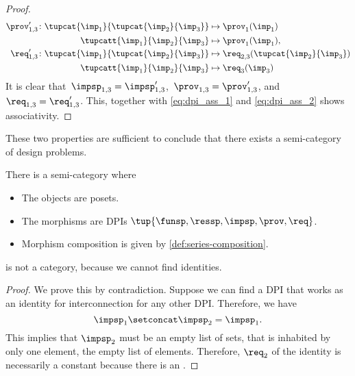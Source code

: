 \begin{proof}
\begin{equation}
\begin{aligned}
    \prov'_{1,3} \colon  \tupcat {\imp_{1}}{\tupcat {\imp_{2}} {\imp_{3}}}   &\mapsto\prov_{1}(\imp_{1})\\
    \tupcatt{\imp_{1}}{\imp_{2}}{\imp_{3}} &\mapsto\prov_{1}(\imp_{1}),\\
    \req'_{1,3} \colon  \tupcat {\imp_{1}}{\tupcat {\imp_{2}} {\imp_{3}}} &\mapsto\req_{2,3}(\tupcat {\imp_{2}} {\imp_{3}})\\
    \tupcatt{\imp_{1}}{\imp_{2}}{\imp_{3}}&\mapsto \req_{3}(\imp_{3})
  \end{aligned}
  \end{equation}
It is clear that~$\impsp_{1,3}=\impsp'_{1,3}$,~$\prov_{1,3}=\prov'_{1,3}$, and~$\req_{1,3}=\req'_{1,3}$.
  This, together with \cref{eq:dpi_ass_1} and \cref{eq:dpi_ass_2} shows associativity.
\end{proof}

These two properties are sufficient to conclude that there exists a semi-category of design problems.



\begin{definition}
  \label{def:DPIcat}
  There is a semi-category \DPI where
  \begin{itemize}
    \item The objects are posets.
    \item The morphisms are DPIs $\tup{\funsp,\ressp,\impsp,\prov,\req}$.
    \item Morphism composition is given by \cref{def:series-composition}.
  \end{itemize}
\end{definition}

\begin{lemma}
\DPI is not a category, because we cannot find identities.
\end{lemma}
\begin{proof}
We prove this by contradiction. Suppose we can find a DPI that works as an identity for interconnection for any other DPI.
Therefore, we have
\begin{equation}
  \impsp_{1} \setconcat \impsp_{2} = \impsp_{1}.
\end{equation}
This implies that $\impsp_{2}$ must be an empty list of sets,  that is inhabited by only one element, the empty list of elements. Therefore, $\req_2$ of the identity is necessarily a constant because there is an .
\end{proof}

